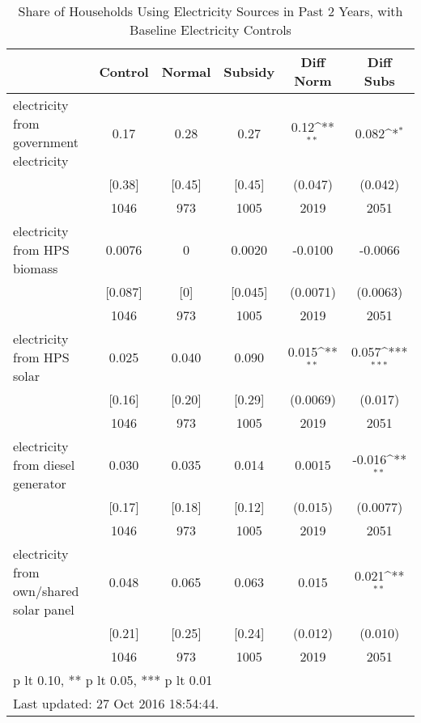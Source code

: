 \begin{table}[htbp]\centering
\def\sym#1{\ifmmode^{#1}\else\(^{#1}\)\fi}
\caption{Share of Households Using Electricity Sources in Past 2 Years, with Baseline Electricity Controls \label{tab:"balance"}}
\begin{tabular*}{0.9\hsize}{@{\hskip\tabcolsep\extracolsep\fill}l*{1}{ccccc}}
\toprule
                                &  Control&   Normal&  Subsidy&Diff Norm         &Diff Subs         \\
\midrule
electricity from government electricity&     0.17&     0.28&     0.27&     0.12\sym{**} &    0.082\sym{*}  \\
                                &   [0.38]&   [0.45]&   [0.45]&  (0.047)         &  (0.042)         \\
                                &     1046&      973&     1005&     2019         &     2051         \\
electricity from HPS biomass    &   0.0076&        0&   0.0020&  -0.0100         &  -0.0066         \\
                                &  [0.087]&      [0]&  [0.045]& (0.0071)         & (0.0063)         \\
                                &     1046&      973&     1005&     2019         &     2051         \\
electricity from HPS solar      &    0.025&    0.040&    0.090&    0.015\sym{**} &    0.057\sym{***}\\
                                &   [0.16]&   [0.20]&   [0.29]& (0.0069)         &  (0.017)         \\
                                &     1046&      973&     1005&     2019         &     2051         \\
electricity from diesel generator&    0.030&    0.035&    0.014&   0.0015         &   -0.016\sym{**} \\
                                &   [0.17]&   [0.18]&   [0.12]&  (0.015)         & (0.0077)         \\
                                &     1046&      973&     1005&     2019         &     2051         \\
electricity from own/shared solar panel&    0.048&    0.065&    0.063&    0.015         &    0.021\sym{**} \\
                                &   [0.21]&   [0.25]&   [0.24]&  (0.012)         &  (0.010)         \\
                                &     1046&      973&     1005&     2019         &     2051         \\
\bottomrule
\multicolumn{6}{l}{\footnotesize * p lt 0.10, ** p lt 0.05, *** p lt 0.01}\\
\multicolumn{6}{l}{\footnotesize Last updated: 27 Oct 2016 18:54:44.}\\
\end{tabular*}
\end{table}
